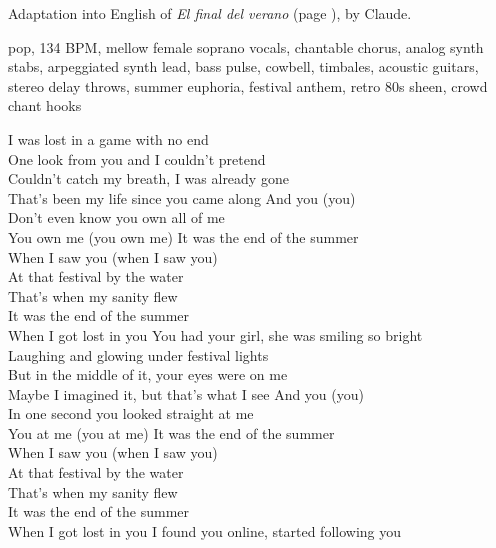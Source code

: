 
\begin{notes}
Adaptation into English of \emph{El final del verano} (page \pageref{sec:verano}), by Claude.
\end{notes}
\begin{style}
pop, 134 BPM, mellow female soprano vocals, chantable chorus, analog synth stabs, arpeggiated synth lead, bass pulse, cowbell, timbales, acoustic guitars, stereo delay throws, summer euphoria, festival anthem, retro 80s sheen, crowd chant hooks
\end{style}
\begin{lyrics}
I was lost in a game with no end\\
One look from you and I couldn’t pretend\\
Couldn’t catch my breath, I was already gone\\
That’s been my life since you came along
And you (you)\\
Don’t even know you own all of me\\
You own me (you own me)
It was the end of the summer\\
When I saw you (when I saw you)\\
At that festival by the water\\
That’s when my sanity flew\\
It was the end of the summer\\
When I got lost in you
You had your girl, she was smiling so bright\\
Laughing and glowing under festival lights\\
But in the middle of it, your eyes were on me\\
Maybe I imagined it, but that’s what I see
And you (you)\\
In one second you looked straight at me\\
You at me (you at me)
It was the end of the summer\\
When I saw you (when I saw you)\\
At that festival by the water\\
That’s when my sanity flew\\
It was the end of the summer\\
When I got lost in you
I found you online, started following you\\

\end{lyrics}
